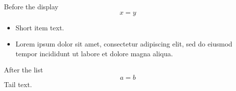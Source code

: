 \documentclass[11pt]{article}
\begin{document}
Before the display
\[ x = y \]
\begin{itemize}
\item Short item text.
\item Lorem ipsum dolor sit amet, consectetur adipiscing elit, sed do eiusmod tempor incididunt ut labore et dolore magna aliqua.
\end{itemize}
After the list
\[ a = b \]
Tail text.
\end{document}
